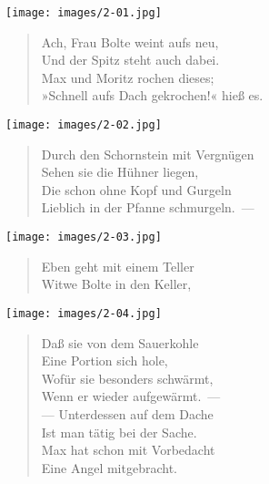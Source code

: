 \documentclass[a4paper,12pt]{article}
\begin{document}
\begin{center}\texttt{[image: images/2-01.jpg]}\end{center}



\begin{verse}
Ach, Frau Bolte weint aufs neu,\\{}
Und der Spitz steht auch dabei.\\{}
Max und Moritz rochen dieses;\\{}
»Schnell aufs Dach gekrochen!« hieß es.
\end{verse}



\begin{center}\texttt{[image: images/2-02.jpg]}\end{center}



\begin{verse}
Durch den Schornstein mit Vergnügen\\{}
Sehen sie die Hühner liegen,\\{}
Die schon ohne Kopf und Gurgeln\\{}
Lieblich in der Pfanne schmurgeln.~—
\end{verse}



\begin{center}\texttt{[image: images/2-03.jpg]}\end{center}



\begin{verse}
Eben geht mit einem Teller\\{}
Witwe Bolte in den Keller,
\end{verse}



\begin{center}\texttt{[image: images/2-04.jpg]}\end{center}



\begin{verse}
Daß sie von dem Sauerkohle\\{}
Eine Portion sich hole,\\{}
Wofür sie besonders schwärmt,\\{}
Wenn er wieder aufgewärmt.~—\\{}
— Unterdessen auf dem Dache\\{}
Ist man tätig bei der Sache.\\{}
Max hat schon mit Vorbedacht\\{}
Eine Angel mitgebracht.
\end{verse}
\end{document}
